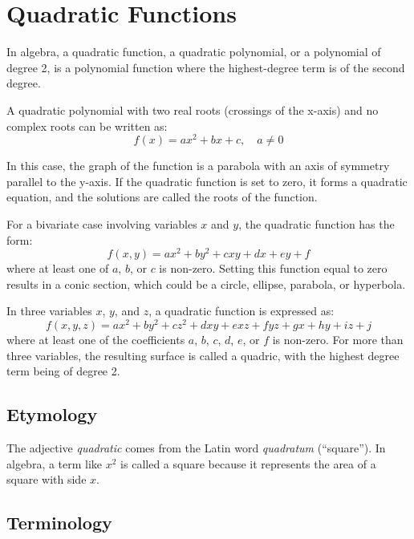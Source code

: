 \section{Quadratic Functions}
\label{sec:quad-e70d}
In algebra, a quadratic function, a quadratic polynomial, or a polynomial of degree 2, is
a polynomial function where the highest-degree term is of the second degree.

A quadratic polynomial with two real roots (crossings of the x-axis) and no complex roots
can be written as:
\[
f(x) = ax^2 + bx + c, \quad a \neq 0
\]

In this case, the graph of the function is a parabola with an axis of symmetry parallel to
the y-axis. If the quadratic function is set to zero, it forms a quadratic equation, and
the solutions are called the roots of the function.

For a bivariate case involving variables $x$ and $y$, the quadratic function has the form:
\[
f(x, y) = ax^2 + by^2 + cxy + dx + ey + f
\]
where at least one of $a$, $b$, or $c$ is non-zero. Setting this function equal to zero results in a conic section, which could be a circle, ellipse, parabola, or hyperbola.

In three variables $x$, $y$, and $z$, a quadratic function is expressed as:
\[
f(x, y, z) = ax^2 + by^2 + cz^2 + dxy + exz + fyz + gx + hy + iz + j
\]
where at least one of the coefficients $a$, $b$, $c$, $d$, $e$, or $f$ is non-zero. For more than three variables, the resulting surface is called a quadric, with the highest degree term being of degree 2.

\subsection{Etymology}
\label{sss:etym-a4f6}

The adjective \textit{quadratic} comes from the Latin word \textit{quadratum} (``square''). In algebra, a term like $x^2$ is called a square because it represents the area of a square with side $x$.

\subsection{Terminology}
\label{sss:term-40dc}


